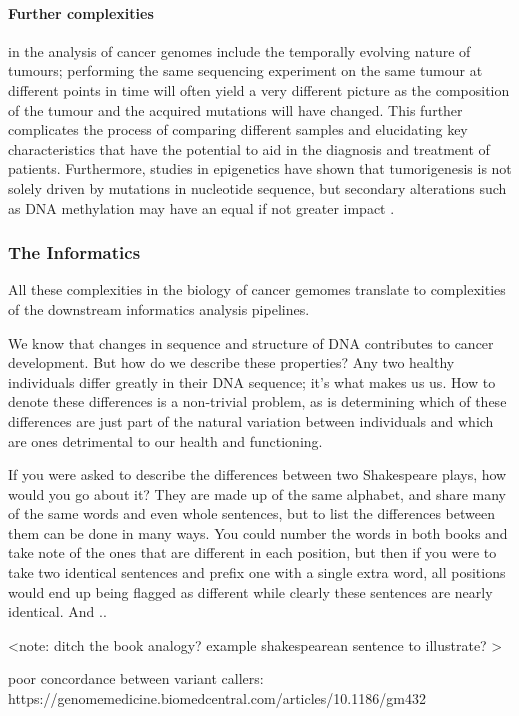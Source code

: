 \paragraph{Further complexities} in the analysis of cancer genomes include the temporally evolving nature of tumours; performing the same sequencing experiment on the same tumour at different points in time will often yield a very different picture as the composition of the tumour and the acquired mutations will have changed. This further complicates the process of comparing different samples and elucidating key characteristics that have the potential to aid in the diagnosis and treatment of patients. Furthermore, studies in epigenetics have shown that tumorigenesis is not solely driven by mutations in nucleotide sequence, but secondary alterations such as DNA methylation may have an equal if not greater impact \cite{TODO}.

\subsubsection{The Informatics}

All these complexities in the biology of cancer gemomes translate to complexities of the downstream informatics analysis pipelines.


We know that changes in sequence and structure of DNA contributes to cancer development. But how do we describe these properties? Any two healthy individuals differ greatly in their DNA sequence; it's what makes us us. How to denote these differences is a non-trivial problem, as is determining which of these differences are just part of the natural variation between individuals and which are ones detrimental to our health and functioning.

If you were asked to describe the differences between two Shakespeare plays, how would you go about it? They are made up of the same alphabet, and share many of the same words and even whole sentences, but to list the differences between them can be done in many ways. You could number the words in both books and take note of the ones that are different in each position, but then if you were to take two identical sentences and prefix one with a single extra word, all positions would end up being flagged as different while clearly these sentences are nearly identical. And ..

<note: ditch the book analogy? example shakespearean sentence to illustrate? >

poor concordance between variant callers: https://genomemedicine.biomedcentral.com/articles/10.1186/gm432


